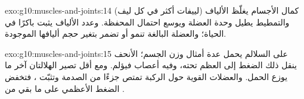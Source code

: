 \begin{solution}{exo:g10:muscles-and-joints:14}
كمال الأجسام يغلّظ الألياف (لييفات أكثر في كل ليف) والتمطيط يطيل وحدة
العضلة  ويوسع احتمال المحفظة. وعدد الألياف يثبت باكرًا في
الحياة؛ والعضلة البالغة تنمو أو تضمر بتغير حجم أليافها الموجودة.
\end{solution}

\begin{solution}{exo:g10:muscles-and-joints:15}
على السلالم يحمل  عدة أمثال وزن الجسم؛  الأنحف ينقل ذلك
الضغط إلى العظم تحته، وفيه أعصاب فيؤلم. ومع  أقل تصير الهلالتان
آخر ما يوزع الحمل. والعضلات القوية حول الركبة تمتص جزءًا من الصدمة
وتثبّت ، فتخفض الضغط الأعظمي على ما بقي من .
\end{solution}

